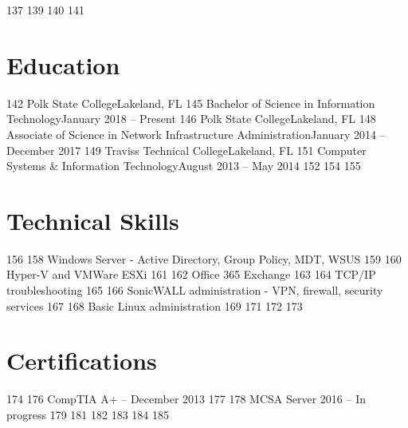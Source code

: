
137     
139
140   %
141   \section{Education}
142                     {Polk State College}{Lakeland, FL}
145         {Bachelor of Science in Information Technology}{January 2018 -- Present}
146                {Polk State College}{Lakeland, FL}
148         {Associate of Science in Network Infrastructure Administration}{January 2014 -- December 2017}
149                {Traviss Technical College}{Lakeland, FL}
151         {Computer Systems \& Information Technology}{August 2013 -- May 2014}
152     
154   %
155   \section{Technical Skills}
156            \resumeSubItem{}
158         {Windows Server - Active Directory, Group Policy, MDT, WSUS}
159       \resumeSubItem{}
160         {Hyper-V and VMWare ESXi}
161       \resumeSubItem{}
162         {Office 365 Exchange}
163       \resumeSubItem{}
164         {TCP/IP troubleshooting}
165       \resumeSubItem{}
166         {SonicWALL administration - VPN, firewall, security services}
167       \resumeSubItem{}
168         {Basic Linux administration}
169     
171   %
172   %
173   \section{Certifications}
174           \resumeSubItem{}
176         {CompTIA A+ -- December 2013}
177       \resumeSubItem{}
178         {MCSA Server 2016 -- In progress}
179     
181
182   %
183   %
184   
185
